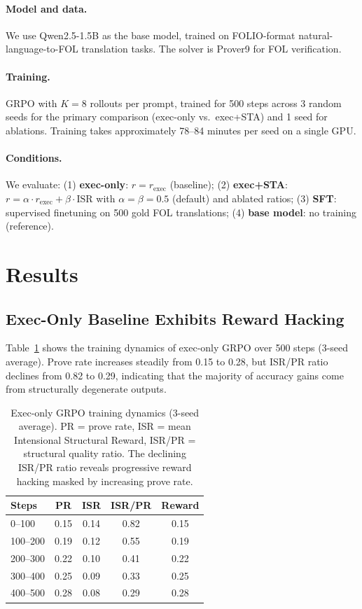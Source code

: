 \documentclass[11pt,a4paper]{article}
\begin{document}
\paragraph{Model and data.}
We use Qwen2.5-1.5B as the base model, trained on FOLIO-format natural-language-to-FOL translation tasks.
The solver is Prover9 for FOL verification.

\paragraph{Training.}
GRPO with $K = 8$ rollouts per prompt, trained for 500 steps across 3 random seeds for the primary comparison (exec-only vs.\ exec+STA) and 1 seed for ablations.
Training takes approximately 78--84 minutes per seed on a single GPU.

\paragraph{Conditions.}
We evaluate: (1) \textbf{exec-only}: $r = r_{\text{exec}}$ (baseline); (2) \textbf{exec+STA}: $r = \alpha \cdot r_{\text{exec}} + \beta \cdot \text{ISR}$ with $\alpha = \beta = 0.5$ (default) and ablated ratios; (3) \textbf{SFT}: supervised finetuning on 500 gold FOL translations; (4) \textbf{base model}: no training (reference).

\section{Results}

\subsection{Exec-Only Baseline Exhibits Reward Hacking}
\label{sec:exec-only}

Table~\ref{tab:exec-only} shows the training dynamics of exec-only GRPO over 500 steps (3-seed average).
Prove rate increases steadily from 0.15 to 0.28, but ISR/PR ratio declines from 0.82 to 0.29, indicating that the majority of accuracy gains come from structurally degenerate outputs.

\begin{table}[t]
\centering
\small
\begin{tabular}{lcccc}
\toprule
\textbf{Steps} & \textbf{PR} & \textbf{ISR} & \textbf{ISR/PR} & \textbf{Reward} \\
\midrule
0--100   & 0.15 & 0.14  & 0.82 & 0.15 \\
100--200 & 0.19 & 0.12  & 0.55 & 0.19 \\
200--300 & 0.22 & 0.10  & 0.41 & 0.22 \\
300--400 & 0.25 & 0.09  & 0.33 & 0.25 \\
400--500 & 0.28 & 0.08  & 0.29 & 0.28 \\
\bottomrule
\end{tabular}
\caption{Exec-only GRPO training dynamics (3-seed average). PR = prove rate, ISR = mean Intensional Structural Reward, ISR/PR = structural quality ratio. The declining ISR/PR ratio reveals progressive reward hacking masked by increasing prove rate.}
\label{tab:exec-only}
\end{table}
\end{document}

